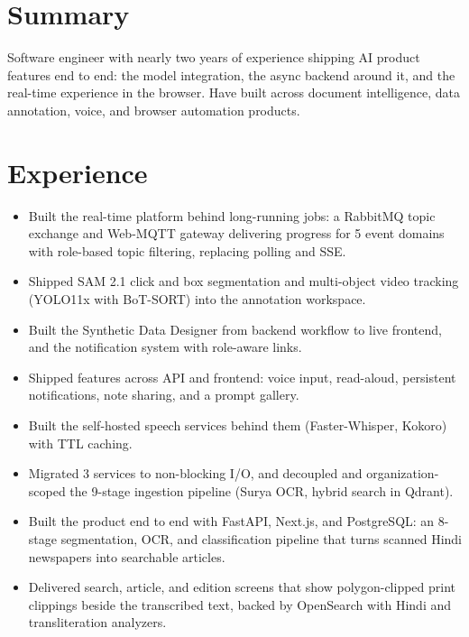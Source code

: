 \documentclass[10pt,a4paper]{article}
\begin{document}

\section{Summary}
Software engineer with nearly two years of experience shipping AI product features end to end: the model integration, the async backend around it, and the real-time experience in the browser. Have built across document intelligence, data annotation, voice, and browser automation products.

\section{Experience}

\begin{itemize}
  \item Built the real-time platform behind long-running jobs: a RabbitMQ topic exchange and Web-MQTT gateway delivering progress for 5 event domains with role-based topic filtering, replacing polling and SSE.
  \item Shipped SAM 2.1 click and box segmentation and multi-object video tracking (YOLO11x with BoT-SORT) into the annotation workspace.
  \item Built the Synthetic Data Designer from backend workflow to live frontend, and the notification system with role-aware links.
\end{itemize}

\begin{itemize}
  \item Shipped features across API and frontend: voice input, read-aloud, persistent notifications, note sharing, and a prompt gallery.
  \item Built the self-hosted speech services behind them (Faster-Whisper, Kokoro) with TTL caching.
  \item Migrated 3 services to non-blocking I/O, and decoupled and organization-scoped the 9-stage ingestion pipeline (Surya OCR, hybrid search in Qdrant).
\end{itemize}

\begin{itemize}
  \item Built the product end to end with FastAPI, Next.js, and PostgreSQL: an 8-stage segmentation, OCR, and classification pipeline that turns scanned Hindi newspapers into searchable articles.
  \item Delivered search, article, and edition screens that show polygon-clipped print clippings beside the transcribed text, backed by OpenSearch with Hindi and transliteration analyzers.
\end{itemize}
\end{document}
